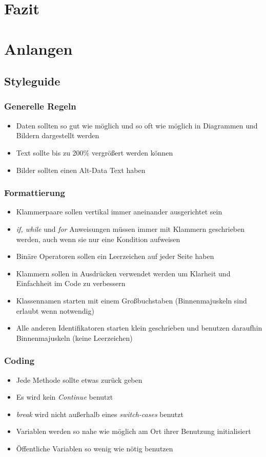 \documentclass[11pt]{article}
\begin{document}
\section{Fazit}

\pagebreak

\section{Anlangen}
\label{chap: Anlagen}
\subsection{Styleguide}
\subsubsection{Generelle Regeln}
\begin{itemize}
\item Daten sollten so gut wie möglich und so oft wie möglich in Diagrammen und Bildern dargestellt werden
\item Text sollte bis zu 200\% vergrößert werden können
\item Bilder sollten einen Alt-Data Text haben
\end{itemize}

\subsubsection{Formattierung}
\begin{itemize}
\item Klammerpaare sollen vertikal immer aneinander ausgerichtet sein
\item \textit{if, while} und \textit{for} Anweisungen müssen immer mit Klammern geschrieben werden, auch wenn sie nur eine Kondition aufweisen
\item Binäre Operatoren sollen ein Leerzeichen auf jeder Seite haben
\item Klammern sollen in Ausdrücken verwendet werden um Klarheit und Einfachheit im Code zu verbessern
\item Klassennamen starten mit einem Großbuchstaben (Binnenmajuskeln sind erlaubt wenn notwendig)
\item Alle anderen Identifikatoren starten klein geschrieben und benutzen daraufhin Binnenmajuskeln (keine Leerzeichen)
\end{itemize}

\subsubsection{Coding}
\begin{itemize}
\item Jede Methode sollte etwas zurück geben
\item Es wird kein \textit{Continue} benutzt
\item \textit{break} wird nicht außerhalb eines \textit{switch-cases} benutzt
\item Variablen werden so nahe wie möglich am Ort ihrer Benutzung initialisiert
\item Öffentliche Variablen so wenig wie nötig benutzen
\end{itemize}
\end{document}
